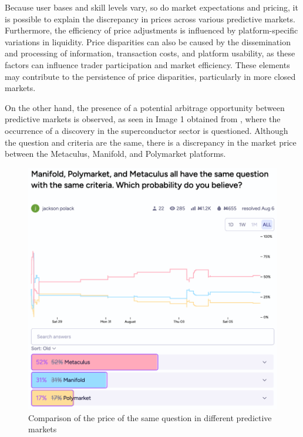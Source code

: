 Because user bases and skill levels vary, so do market expectations and pricing, it is possible to explain the discrepancy in prices across various predictive markets. Furthermore, the efficiency of price adjustments is influenced by platform-specific variations in liquidity. Price disparities can also be caused by the dissemination and processing of information, transaction costs, and platform usability, as these factors can influence trader participation and market efficiency. These elements may contribute to the persistence of price disparities, particularly in more closed markets.

On the other hand, the presence of a potential arbitrage opportunity between predictive markets is observed, as seen in Image 1 obtained from \citeauthor{lPolack}, where the occurrence of a discovery in the superconductor sector is questioned. Although the question and criteria are the same, there is a discrepancy in the market price between the Metaculus, Manifold, and Polymarket platforms.

\begin{figure}[H]
    \centering
    \includegraphics[scale=0.6]{img/MarketComparison.png}
    \caption{Comparison of the price of the same question in different predictive markets}
    \label{fig:market_comparison}
\end{figure}

